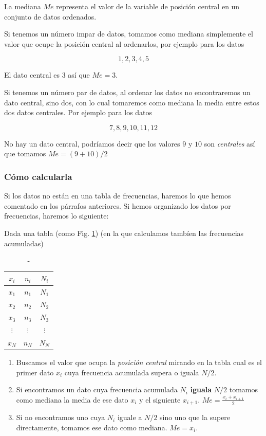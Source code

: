 \documentclass[]{article}
\providecommand{\tightlist}{%
  \setlength{\itemsep}{0pt}\setlength{\parskip}{0pt}}
\theoremstyle{plain}
\theoremstyle{definition}
\theoremstyle{definition} %
\begin{document}
La mediana \(Me\) representa el valor de la variable de posición central
en un conjunto de datos ordenados.

Si tenemos un número impar de datos, tomamos como mediana simplemente el
valor que ocupe la posición central al ordenarlos, por ejemplo para los
datos

\[1, 2, 3, 4, 5\]

El dato central es \(3\) así que \(Me = 3\).

Si tenemos un número par de datos, al ordenar los datos no encontraremos
un dato central, sino dos, con lo cual tomaremos como mediana la media
entre estos dos datos centrales. Por ejemplo para los datos

\[7, 8, 9, 10, 11, 12 \]

No hay un dato central, podríamos decir que los valores \(9\) y \(10\)
son \emph{centrales} así que tomamos \(Me= (9+10)/2\)

\hypertarget{cuxf3mo-calcularla-2}{%
\subsubsection{Cómo calcularla}\label{cuxf3mo-calcularla-2}}

Si los datos no están en una tabla de frecuencias, haremos lo que hemos
comentado en los párrafos anteriores. Si hemos organizado los datos por
frecuencias, haremos lo siguiente:

Dada una tabla (como Fig. \ref{tb_cuantiles}) (en la que calculamos tambíen las frecuencias acumuladas)

\begin{table}[htbp]
  \centering
\begin{tabular}{ccc}
\(x_i\) & \(n_i\) & \(N_i\)\\
\hline
\(x_1\) & \(n_1\) & \(N_1\)         \\
\(x_2\) & \(n_2\) & \(N_2\)         \\
\(x_3\) & \(n_3\) & \(N_3\)         \\
\(\vdots\) & \(\vdots\) & \(\vdots\)\\
\(x_N\) & \(n_N\) & \(N_N\)\\
\end{tabular}
\caption{-}\label{tb_cuantiles}
\end{table}

\begin{enumerate}
\def\labelenumi{\arabic{enumi}.}
\tightlist
\item
  Buscamos el valor que ocupa la \emph{posición central} mirando en la
  tabla cual es el primer dato \(x_i\) cuya frecuencia acumulada supera
  o iguala \(N/2\).
\item
  Si encontramos un dato cuya frecuencia acumulada \(N_i\)
  \textbf{iguala} \(N/2\) tomamos como mediana la media de ese dato
  \(x_i\) y el siguiente \(x_{i+1}\). \(Me = \frac{x_{i} + x_{i+1}}{2}\)
\item
  Si no encontramos uno cuya \(N_i\) iguale a \(N/2\) sino uno que la
  supere directamente, tomamos ese dato como mediana. \(Me = x_i\).
\end{enumerate}
\end{document}
